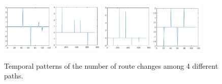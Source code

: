 \documentclass[sigconf]{acmart}
\begin{document}
\begin{figure} 	
	\includegraphics[width=0.22\textwidth]{fig/route_change_8} 
	\label{fig:3.2a}
	\includegraphics[width=0.22\textwidth]{fig/route_change_20}
	\label{fig:3.2b}
	\includegraphics[width=0.22\textwidth]{fig/route_change_21}
	\label{fig:3.2c}
	\includegraphics[width=0.22\textwidth]{fig/route_change_30}
	\label{fig:3.2d}
	
	\caption{Temporal patterns of the number of route changes among 4 different paths.}
	\label{fig:3.2}  
\end{figure}
\end{document}

